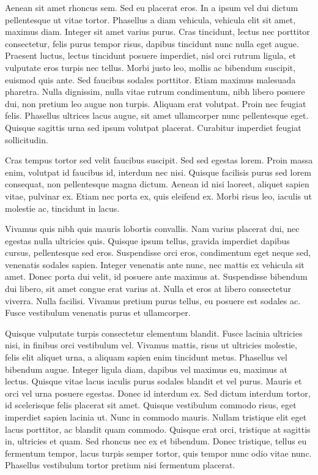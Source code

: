 Aenean sit amet rhoncus sem. Sed eu placerat eros. In a ipsum vel dui dictum pellentesque ut vitae tortor. Phasellus a diam vehicula, vehicula elit sit amet, maximus diam. Integer sit amet varius purus. Cras tincidunt, lectus nec porttitor consectetur, felis purus tempor risus, dapibus tincidunt nunc nulla eget augue. Praesent luctus, lectus tincidunt posuere imperdiet, nisl orci rutrum ligula, et vulputate eros turpis nec tellus. Morbi justo leo, mollis ac bibendum suscipit, euismod quis ante. Sed faucibus sodales porttitor. Etiam maximus malesuada pharetra. Nulla dignissim, nulla vitae rutrum condimentum, nibh libero posuere dui, non pretium leo augue non turpis. Aliquam erat volutpat. Proin nec feugiat felis. Phasellus ultrices lacus augue, sit amet ullamcorper nunc pellentesque eget. Quisque sagittis urna sed ipsum volutpat placerat. Curabitur imperdiet feugiat sollicitudin.

Cras tempus tortor sed velit faucibus suscipit. Sed sed egestas lorem. Proin massa enim, volutpat id faucibus id, interdum nec nisi. Quisque facilisis purus sed lorem consequat, non pellentesque magna dictum. Aenean id nisi laoreet, aliquet sapien vitae, pulvinar ex. Etiam nec porta ex, quis eleifend ex. Morbi risus leo, iaculis ut molestie ac, tincidunt in lacus.

Vivamus quis nibh quis mauris lobortis convallis. Nam varius placerat dui, nec egestas nulla ultricies quis. Quisque ipsum tellus, gravida imperdiet dapibus cursus, pellentesque sed eros. Suspendisse orci eros, condimentum eget neque sed, venenatis sodales sapien. Integer venenatis ante nunc, nec mattis ex vehicula sit amet. Donec porta dui velit, id posuere ante maximus at. Suspendisse bibendum dui libero, sit amet congue erat varius at. Nulla et eros at libero consectetur viverra. Nulla facilisi. Vivamus pretium purus tellus, eu posuere est sodales ac. Fusce vestibulum venenatis purus et ullamcorper.

Quisque vulputate turpis consectetur elementum blandit. Fusce lacinia ultricies nisi, in finibus orci vestibulum vel. Vivamus mattis, risus ut ultricies molestie, felis elit aliquet urna, a aliquam sapien enim tincidunt metus. Phasellus vel bibendum augue. Integer ligula diam, dapibus vel maximus eu, maximus at lectus. Quisque vitae lacus iaculis purus sodales blandit et vel purus. Mauris et orci vel urna posuere egestas. Donec id interdum ex. Sed dictum interdum tortor, id scelerisque felis placerat sit amet. Quisque vestibulum commodo risus, eget imperdiet sapien lacinia ut. Nunc in commodo mauris. Nullam tristique elit eget lacus porttitor, ac blandit quam commodo. Quisque erat orci, tristique at sagittis in, ultricies et quam. Sed rhoncus nec ex et bibendum. Donec tristique, tellus eu fermentum tempor, lacus turpis semper tortor, quis tempor nunc odio vitae nunc. Phasellus vestibulum tortor pretium nisi fermentum placerat.

